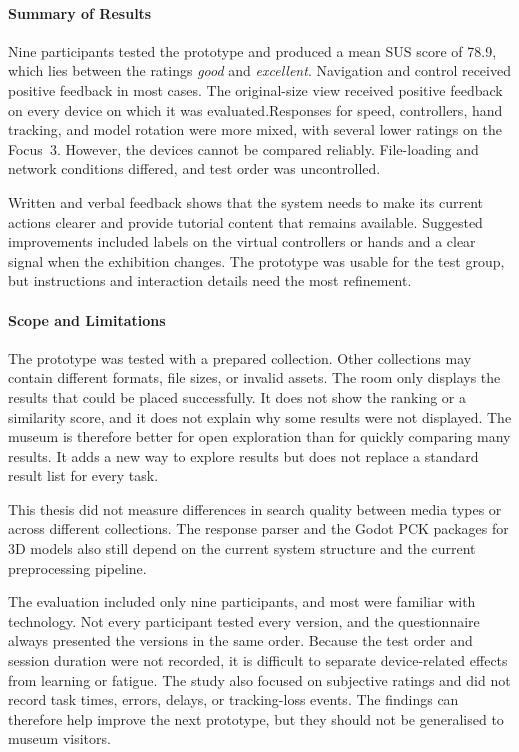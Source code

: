 \paragraph{Summary of Results}
Nine participants tested the prototype and produced a mean SUS score of 78.9, which lies between the ratings \emph{good} and \emph{excellent}. Navigation and control received positive feedback in most cases. The original-size view received positive feedback on every device on which it was evaluated.Responses for speed, controllers, hand tracking, and model rotation were more mixed, with several lower ratings on the Focus~3. However, the devices cannot be compared reliably. File-loading and network conditions differed, and test order was uncontrolled.

Written and verbal feedback shows that the system needs to make its current actions clearer and provide tutorial content that remains available. Suggested improvements included labels on the virtual controllers or hands and a clear signal when the exhibition changes. The prototype was usable for the test group, but instructions and interaction details need the most refinement.

\paragraph{Scope and Limitations}
The prototype was tested with a prepared collection. Other collections may contain different formats, file sizes, or invalid assets. The room only displays the results that could be placed successfully. It does not show the ranking or a similarity score, and it does not explain why some results were not displayed. The museum is therefore better for open exploration than for quickly comparing many results. It adds a new way to explore results but does not replace a standard result list for every task.

This thesis did not measure differences in search quality between media types or across different collections. The response parser and the Godot PCK packages for 3D models also still depend on the current system structure and the current preprocessing pipeline.

The evaluation included only nine participants, and most were familiar with technology. Not every participant tested every version, and the questionnaire always presented the versions in the same order. Because the test order and session duration were not recorded, it is difficult to separate device-related effects from learning or fatigue. The study also focused on subjective ratings and did not record task times, errors, delays, or tracking-loss events. The findings can therefore help improve the next prototype, but they should not be generalised to museum visitors.

